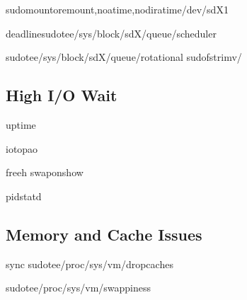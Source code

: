 \documentclass[letterpaper,10pt,english]{sphinxmanual}
\begin{document}
\sphinxAtStartPar
{}

\begin{sphinxVerbatim}[commandchars=\\\{\}]
sudomount\PYGZhy{}oremount,noatime,nodiratime/dev/sdX1

deadlinesudotee/sys/block/sdX/queue/scheduler

sudotee/sys/block/sdX/queue/rotational
sudofstrim\PYGZhy{}v/
\end{sphinxVerbatim}


\subsection{High I/O Wait}
\label{\detokenize{troubleshooting:high-i-o-wait}}
\sphinxAtStartPar
{}

\begin{sphinxVerbatim}[commandchars=\\\{\}]
uptime

iotop\PYGZhy{}a\PYGZhy{}o

free\PYGZhy{}h
swapon\PYGZhy{}\PYGZhy{}show

pidstat\PYGZhy{}d
\end{sphinxVerbatim}


\subsection{Memory and Cache Issues}
\label{\detokenize{troubleshooting:memory-and-cache-issues}}
\sphinxAtStartPar
{}

\begin{sphinxVerbatim}[commandchars=\\\{\}]
sync
sudotee/proc/sys/vm/drop\PYGZus{}caches

sudotee/proc/sys/vm/swappiness
\end{sphinxVerbatim}
\end{document}
